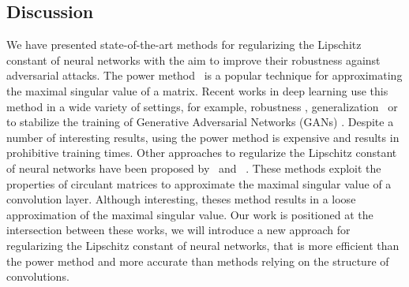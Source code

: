 \subsection{Discussion}

We have presented state-of-the-art methods for regularizing the Lipschitz constant of neural networks with the aim to improve their robustness against adversarial attacks.
The power method~\cite{golub2000eigenvalue} is a popular technique for approximating the maximal singular value of a matrix.
Recent works in deep learning use this method in a wide variety of settings, for example, robustness \cite{farnia2018generalizable,tsuzuku2018lipschitz}, generalization~\cite{yoshida2017spectral,gouk2018regularisation} or to stabilize the training of Generative Adversarial Networks (GANs) \cite{miyato2018spectral}.
Despite a number of interesting results, using the power method is expensive and results in prohibitive training times. 
Other approaches to regularize the Lipschitz constant of neural networks have been proposed by~\citet{sedghi2018singular} and ~\citet{singla2019bounding}.
These methods exploit the properties of circulant matrices to approximate the maximal singular value of a convolution layer.
Although interesting, theses method results in a loose approximation of the maximal singular value.
Our work is positioned at the intersection between these works, we will introduce a new approach for regularizing the Lipschitz constant of neural networks, that is more efficient than the power method and more accurate than methods relying on the structure of convolutions.






